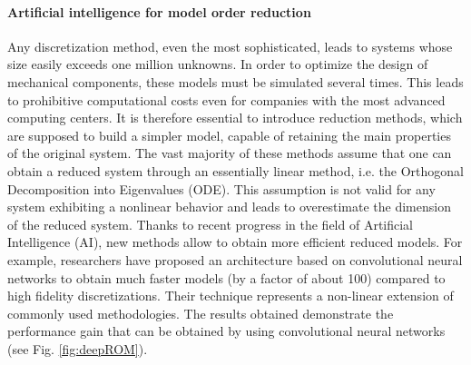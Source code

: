 \documentclass[12pt]{article}
\begin{document}
	\paragraph{Artificial intelligence for model order reduction\\}
	Any discretization method, even the most sophisticated, leads to systems whose size easily exceeds one million unknowns. In order to optimize the design of mechanical components, these models must be simulated several times. This leads to prohibitive computational costs even for companies with the most advanced computing centers. It is therefore essential to introduce reduction methods, which are supposed to build a simpler model, capable of retaining the main properties of the original system. The vast majority of these methods assume that one can obtain a reduced system through an essentially linear method, i.e. the Orthogonal Decomposition into Eigenvalues (ODE). This assumption is not valid for any system exhibiting a nonlinear behavior and leads to overestimate the dimension of the reduced system. Thanks to recent progress in the field of Artificial Intelligence (AI), new methods allow to obtain more efficient reduced models. For example, researchers have proposed an architecture based on convolutional neural networks to obtain much faster models (by a factor of about 100) compared to high fidelity discretizations. Their technique represents a non-linear extension of commonly used methodologies. The results obtained demonstrate the performance gain that can be obtained by using convolutional neural networks (see Fig. \ref{fig:deepROM}).
	
\end{document}
